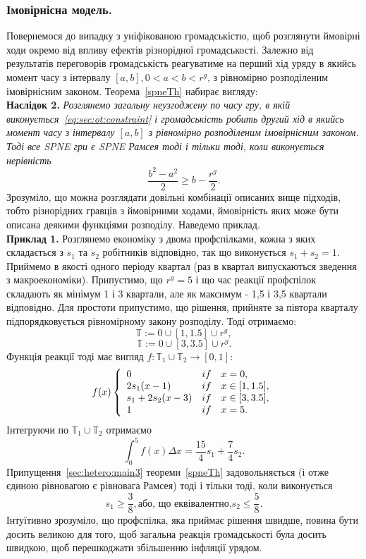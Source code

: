 \subsubsection{Імовірнісна модель.}
Повернемося до випадку з уніфікованою громадськістю, щоб розглянути ймовірні ходи окремо від впливу ефектів різнорідної громадськості. Залежно від результатів переговорів громадськість реагуватиме на перший хід уряду в якийсь момент часу з інтервалу  $[a,b], 0< a < b < r^g$, з рівномірно розподіленим імовірнісним законом. Теорема~\ref{spneTh} набирає вигляду:\\
\textbf{Наслідок 2.} \textit{Розглянемо загальну неузгоджену по часу гру, в якій виконується~\eqref{eq:sec:ot:constraint} і громадськість робить другий хід в якийсь момент часу з інтервалу $[a,b]$ з рівномірно розподіленим імовірнісним законом. Тоді все SPNE гри є SPNE Рамсея тоді і тільки тоді, коли виконується нерівність
	\begin{equation}
	\label{sec:hetero:main5}
	\frac{b^2 - a^2}{2} \geqslant b - \frac{r^g}{2} .
	\end{equation}
}
Зрозуміло, що можна розглядати довільні комбінації описаних вище підходів, тобто різнорідних гравців з ймовірними ходами, ймовірність яких може бути описана деякими функціями розподілу. Наведемо приклад.\\
\textbf{Приклад 1.} Розглянемо економіку з двома профспілками, кожна з яких складається з $s_1$ та $s_2$ робітників відповідно, так що виконується $s_1 + s_2 = 1$. Приймемо в якості одного періоду квартал (раз в квартал випускаються зведення з макроекономіки). Припустимо, що $r^g = 5$ і що час реакції профспілок складають як мінімум 1 і 3 квартали, але як максимум - 1,5 і 3,5 квартали відповідно. Для простоти припустимо, що рішення, прийняте за півтора кварталу підпорядковується рівномірному закону розподілу. Тоді отримаємо:
$$ \mathbb{T} :={0} \cup [1, 1.5] \cup {r^g} ,$$
$$ \mathbb{T} :={0} \cup [3, 3.5] \cup {r^g} .$$
Функція реакції тоді має вигляд $f : \mathbb{T}_1\cup\mathbb{T}_2\to[0,1]$:
$$ f(x)\left\{  
\begin{array}{l c l}
0 & if & x = 0,\\
2s_1(x - 1) & if & x \in [1,1.5],\\
s_1 + 2s_2(x - 3) & if & x \in [3,3.5],\\
1 & if & x = 5.
\end{array} 
\right.$$
Iнтегруючи по $\mathbb{T}_1\cup\mathbb{T}_2$ отримаємо
$$ \int_0^5 f(x) \Delta x = \frac{15}{4}s_1 + \frac{7}{4}s_2. $$
Припущення~\eqref{sec:hetero:main3} теореми~\ref{spneTh} задовольняється (і отже єдиною рівновагою є рівновага Рамсея) тоді і тільки тоді, коли виконується
$$ s_1 \geqslant \frac{3}{8}, \text{або, що еквівалентно,} s_2 \leqslant \frac{5}{8}. $$
Інтуїтивно зрозуміло, що профспілка, яка приймає рішення швидше, повина бути досить великою для того, щоб загальна реакція громадськості була досить швидкою, щоб перешкоджати збільшенню інфляції урядом.

